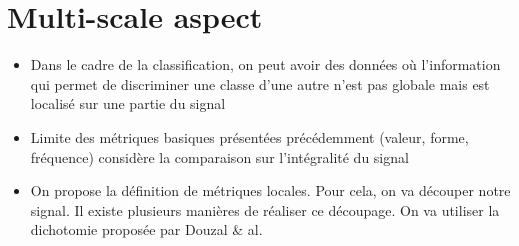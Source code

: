 \section{Multi-scale aspect}
\begin{itemize}
	\item Dans le cadre de la classification, on peut avoir des données où l'information qui permet de discriminer une classe d'une autre n'est pas globale mais est localisé sur une partie du signal
	\item Limite des métriques basiques présentées précédemment (valeur, forme, fréquence) considère la comparaison sur l'intégralité du signal
	\item On propose la définition de métriques locales. Pour cela, on va découper notre signal. Il existe plusieurs manières de réaliser ce découpage. On va utiliser la dichotomie proposée par Douzal \& al.
\end{itemize}


